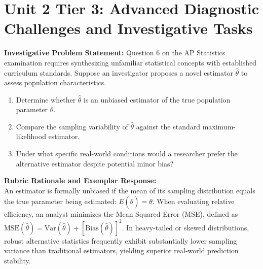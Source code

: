 \section{Unit 2 Tier 3: Advanced Diagnostic Challenges and Investigative Tasks}
\begin{frqrubricbox}
\textbf{Investigative Problem Statement:} Question 6 on the AP Statistics examination requires synthesizing unfamiliar statistical concepts with established curriculum standards. Suppose an investigator proposes a novel estimator $\hat{\theta}$ to assess population characteristics.
\begin{enumerate}[label=(\alph*)]
  \item Determine whether $\hat{\theta}$ is an unbiased estimator of the true population parameter $\theta$.
  \item Compare the sampling variability of $\hat{\theta}$ against the standard maximum-likelihood estimator.
  \item Under what specific real-world conditions would a researcher prefer the alternative estimator despite potential minor bias?
\end{enumerate}
\textbf{Rubric Rationale and Exemplar Response:}\\
An estimator is formally unbiased if the mean of its sampling distribution equals the true parameter being estimated: $E(\hat{\theta}) = \theta$. When evaluating relative efficiency, an analyst minimizes the Mean Squared Error (MSE), defined as $\text{MSE}(\hat{\theta}) = \text{Var}(\hat{\theta}) + [\text{Bias}(\hat{\theta})]^2$. In heavy-tailed or skewed distributions, robust alternative statistics frequently exhibit substantially lower sampling variance than traditional estimators, yielding superior real-world prediction stability.
\end{frqrubricbox}\vspace{6pt}
